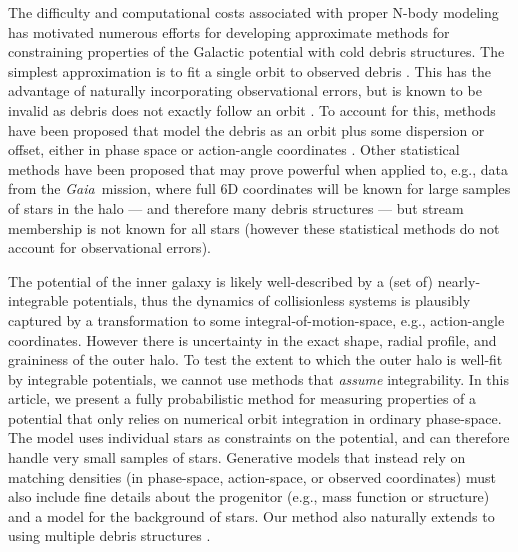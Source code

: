 \documentclass[letterpaper,12pt,preprint]{aastex}
\newcommand{\project}[1]{\textsl{#1}}
\newcommand{\gaia}{\project{Gaia}}
\begin{document}
The difficulty and computational costs associated with proper N-body modeling has motivated numerous efforts for developing approximate methods for constraining properties of the Galactic potential with cold debris structures. The simplest approximation is to fit a single orbit to observed debris \citep[e.g.,][]{koposov10, deg13}. This has the advantage of naturally incorporating observational errors, but is known to be invalid as debris does not exactly follow an orbit \citep[e.g.,][]{eyre11, sanders13a}. To account for this, methods have been proposed that model the debris as an orbit plus some dispersion or offset, either in phase space \citep[e.g.,][]{eyre09a, varghese11, kuepper12} or action-angle coordinates \citep{eyre11, sanders13b, bovy14, sanders14}. Other statistical methods have been proposed \citep[][]{penarrubia12, sanderson14} that may prove powerful when applied to, e.g., data from the \gaia\, mission, where full 6D coordinates will be known for large samples of stars in the halo --- and therefore many debris structures --- but stream membership is not known for all stars (however these statistical methods do not account for observational errors).

The potential of the inner galaxy is likely well-described by a (set of) nearly-integrable potentials, thus the dynamics of collisionless systems is plausibly captured by a transformation to some integral-of-motion-space, e.g., action-angle coordinates. However there is uncertainty in the exact shape, radial profile, and graininess of the outer halo. To test the extent to which the outer halo is well-fit by integrable potentials, we cannot use methods that \emph{assume} integrability. In this article, we present a fully probabilistic method for measuring properties of a potential that only relies on numerical orbit integration in ordinary phase-space. The model uses individual stars as constraints on the potential, and can therefore handle very small samples of stars. Generative models that instead rely on matching densities (in phase-space, action-space, or observed coordinates) must also include fine details about the progenitor (e.g., mass function or structure) and a model for the background of stars. Our method also naturally extends to using multiple debris structures \citep[see][who illustrate the power of using multiple streams to simultaneously constrain the potential]{deg14}.
\end{document}

